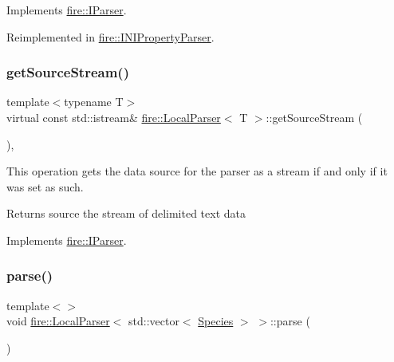 Implements \hyperlink{a00818_ab55d2644dfa6d950d1f874e1e02df095}{fire\+::\+I\+Parser}.



Reimplemented in \hyperlink{a00814_ad02c9a530f20a706d7bb2554813e8d3a}{fire\+::\+I\+N\+I\+Property\+Parser}.

\mbox{\label{a00826_a9bf19a3cc9ae8ac0e6e7a0e7f6212cdc}} 
\subsubsection{\texorpdfstring{get\+Source\+Stream()}{getSourceStream()}}
{\footnotesize\ttfamily template$<$typename T$>$ \\
virtual const std\+::istream\& \hyperlink{a00826}{fire\+::\+Local\+Parser}$<$ T $>$\+::get\+Source\+Stream (\begin{DoxyParamCaption}{ }\end{DoxyParamCaption})\hspace{0.3cm}{\ttfamily [inline]}, {\ttfamily [virtual]}}

This operation gets the data source for the parser as a stream if and only if it was set as such. \begin{DoxyReturn}{Returns}
source the stream of delimited text data 
\end{DoxyReturn}


Implements \hyperlink{a00818_ac94c7a288bf669322b93ba171c43f90e}{fire\+::\+I\+Parser}.

\mbox{\label{a00826_ae904e264fe16708b3e434adea59e1b88}} 
\subsubsection{\texorpdfstring{parse()}{parse()}\hspace{0.1cm}{\footnotesize\ttfamily [1/3]}}
{\footnotesize\ttfamily template$<$$>$ \\
void \hyperlink{a00826}{fire\+::\+Local\+Parser}$<$ std\+::vector$<$ \hyperlink{a00766}{Species} $>$ $>$\+::parse (\begin{DoxyParamCaption}{ }\end{DoxyParamCaption})\hspace{0.3cm}{\ttfamily [virtual]}}

